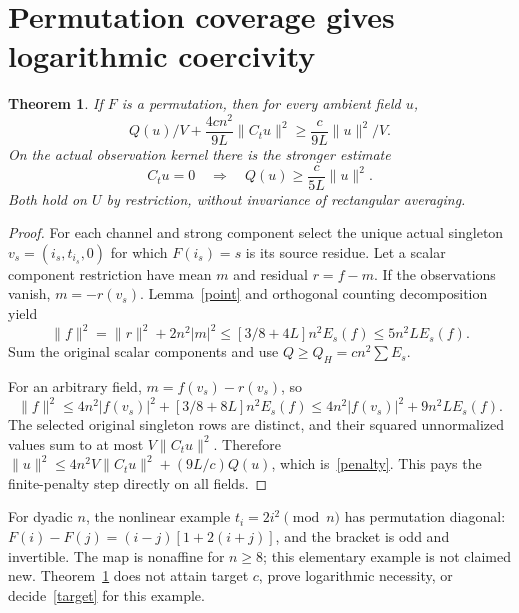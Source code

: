 \documentclass[11pt,a4paper]{article}
\newtheorem{theorem}{Theorem}[section]
\newcommand{\norm}[1]{\lVert#1\rVert}
\begin{document}
\section{Permutation coverage gives logarithmic coercivity}
\begin{theorem}\label{lower}
If $F$ is a permutation, then for every ambient field $u$,
\begin{equation}\label{penalty}
 Q(u)/V+\frac{4cn^2}{9L}\norm{C_tu}^2
                  \geq\frac{c}{9L}\norm{u}^2/V.
\end{equation}
On the actual observation kernel there is the stronger estimate
\begin{equation}\label{kernel}
 C_tu=0\quad\Longrightarrow\quad
                  Q(u)\geq\frac{c}{5L}\norm{u}^2.
\end{equation}
Both hold on $U$ by restriction, without invariance of rectangular averaging.
\end{theorem}
\begin{proof}
For each channel and strong component select the unique actual singleton
$v_s=(i_s,t_{i_s},0)$ for which $F(i_s)=s$ is its source residue. Let a
scalar component restriction have mean $m$ and residual $r=f-m$. If the
observations vanish, $m=-r(v_s)$. Lemma~\ref{point} and orthogonal counting
decomposition yield
\[
 \norm{f}^2=\norm r^2+2n^2|m|^2
 \leq[3/8+4L]n^2E_s(f)\leq5n^2LE_s(f).
\]
Sum the original scalar components and use $Q\geq Q_H=cn^2\sum E_s$.

For an arbitrary field, $m=f(v_s)-r(v_s)$, so
\[
 \norm f^2\leq4n^2|f(v_s)|^2+[3/8+8L]n^2E_s(f)
           \leq4n^2|f(v_s)|^2+9n^2LE_s(f).
\]
The selected original singleton rows are distinct, and their squared
unnormalized values sum to at most $V\norm{C_tu}^2$. Therefore
$\norm u^2\leq4n^2V\norm{C_tu}^2+(9L/c)Q(u)$, which is~\eqref{penalty}.
This pays the finite-penalty step directly on all fields.
\end{proof}

For dyadic $n$, the nonlinear example $t_i=2i^2\pmod n$ has permutation
diagonal: $F(i)-F(j)=(i-j)[1+2(i+j)]$, and the bracket is odd and invertible.
The map is nonaffine for $n\geq8$; this elementary example is not claimed
new. Theorem~\ref{lower} does not attain target $c$, prove logarithmic
necessity, or decide~\eqref{target} for this example.
\end{document}
